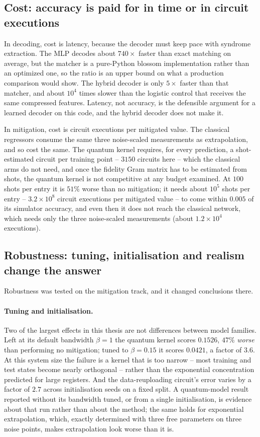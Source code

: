 \documentclass[Thesis.tex]{subfiles}
\begin{document}
\subsection{Cost: accuracy is paid for in time or in circuit executions}

In decoding, cost is latency, because the decoder must keep pace with syndrome
extraction. The MLP decodes about $740\times$ faster than exact matching on average,
but the matcher is a pure-Python blossom implementation rather than an optimized one,
so the ratio is an upper bound on what a production comparison would show. The
hybrid decoder is only $5\times$ faster than that matcher, and about $10^{4}$ times
slower than the logistic control that receives the same compressed features.
Latency, not accuracy, is the defensible argument for a learned decoder on this
code, and the hybrid decoder does not make it.

In mitigation, cost is circuit executions per mitigated value. The classical
regressors consume the same three noise-scaled measurements as extrapolation, and so
cost the same. The quantum kernel requires, for every prediction, a shot-estimated
circuit per training point -- $3150$ circuits here -- which the classical arms do
not need, and once the fidelity Gram matrix has to be estimated from shots, the quantum
kernel is not competitive at any budget examined. At $100$ shots per entry it is
$51\%$ worse than no mitigation; it needs about $10^5$ shots per entry --
$3.2 \times 10^8$ circuit executions per mitigated value -- to come within $0.005$
of its simulator accuracy, and even then it does not reach the classical network,
which needs only the three noise-scaled measurements (about $1.2 \times 10^{4}$
executions).

\subsection{Robustness: tuning, initialisation and realism change the answer}

Robustness was tested on the mitigation track, and it changed conclusions there.

\paragraph{Tuning and initialisation.} Two of the largest effects in this thesis are not differences between model
families. Left at its default bandwidth $\beta = 1$ the quantum kernel scores
$0.1526$, $47\%$ \emph{worse} than performing no mitigation; tuned to
$\beta = 0.15$ it scores $0.0421$, a factor of $3.6$. At this system size the
failure is a kernel that is too narrow -- most training and test states become
nearly orthogonal -- rather than the exponential concentration predicted for large
registers. And the data-reuploading circuit's error varies by a factor of $2.7$
across initialisation seeds on a fixed split. A quantum-model result reported
without its bandwidth tuned, or from a single initialisation, is evidence about that
run rather than about the method; the same holds for exponential extrapolation,
which, exactly determined with three free parameters on three noise points, makes
extrapolation look worse than it is.
\end{document}
